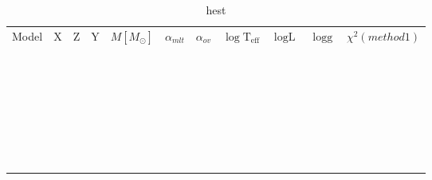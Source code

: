 \begin{table}[htbp]
  \caption{hest}
  \label{bestchi_m1}
  \begin{tabular}{lllllllllll}
 Model & X & Z & Y & $M[M_\odot]$ & $\alpha_{mlt}$ & $\alpha_{ov}$ & $\log \text{T}_\text{eff}$  & $\log \text{L}$  & $\log \text{g}$ & $\chi^2 (method 1)$ \\
 &  &  &  &  &  &  &  &  &  &  \\
 &  &  &  &  &  &  &  &  &  &  \\
 &  &  &  &  &  &  &  &  &  &  \\
 &  &  &  &  &  &  &  &  &  &  \\
 &  &  &  &  &  &  &  &  &  &  \\
 &  &  &  &  &  &  &  &  &  &  \\
 &  &  &  &  &  &  &  &  &  &  \\
 &  &  &  &  &  &  &  &  &  &  \\
 &  &  &  &  &  &  &  &  &  &  \\
 &  &  &  &  &  &  &  &  &  &  \\
 &  &  &  &  &  &  &  &  &  &  \\
 &  &  &  &  &  &  &  &  &  &  \\
 &  &  &  &  &  &  &  &  &  &  \\
 &  &  &  &  &  &  &  &  &  &  \\
 &  &  &  &  &  &  &  &  &  &  \\
 &  &  &  &  &  &  &  &  &  &  \\
 &  &  &  &  &  &  &  &  &  &  \\
 &  &  &  &  &  &  &  &  &  &  \\
 &  &  &  &  &  &  &  &  &  &  \\
 &  &  &  &  &  &  &  &  &  &  \\
 &  &  &  &  &  &  &  &  &  &  \\
 &  &  &  &  &  &  &  &  &  &  \\
 &  &  &  &  &  &  &  &  &  &  \\
 &  &  &  &  &  &  &  &  &  &  \\
 &  &  &  &  &  &  &  &  &  &  \\
 &  &  &  &  &  &  &  &  &  &  \\
 &  &  &  &  &  &  &  &  &  &  \\
 &  &  &  &  &  &  &  &  &  &  \\
 &  &  &  &  &  &  &  &  &  &  \\
 &  &  &  &  &  &  &  &  &  &
\end{tabular}
\end{table}

